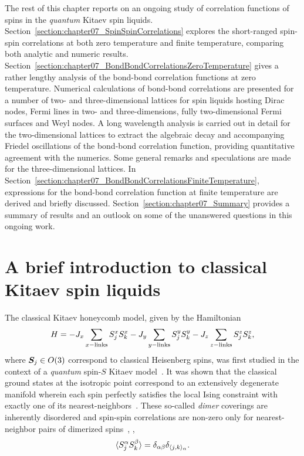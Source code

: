 The rest of this chapter reports on an ongoing study of correlation functions of spins in the \textit{quantum} Kitaev spin liquids.
Section~\ref{section:chapter07_SpinSpinCorrelations} explores the short-ranged spin-spin correlations at both zero temperature and finite temperature, comparing both analytic and numeric results.
Section~\ref{section:chapter07_BondBondCorrelationsZeroTemperature} gives a rather lengthy analysis of the bond-bond correlation functions at zero temperature.
Numerical calculations of bond-bond correlations are presented for a number of two- and three-dimensional lattices for spin liquids hosting Dirac nodes, Fermi lines in two- and three-dimensions, fully two-dimensional Fermi surfaces and Weyl nodes.
A long wavelength analysis is carried out in detail for the two-dimensional lattices to extract the algebraic decay and accompanying Friedel oscillations of the bond-bond correlation function, providing quantitative agreement with the numerics.
Some general remarks and speculations are made for the three-dimensional lattices.
In Section~\ref{section:chapter07_BondBondCorrelationsFiniteTemperature}, expressions for the bond-bond correlation function at finite temperature are derived and briefly discussed.
Section~\ref{section:chapter07_Summary} provides a summary of results and an outlook on some of the unanswered questions in this ongoing work.


%
%
\section{A brief introduction to classical Kitaev spin liquids}
\label{section:chapter07_ClassicalCorrelations}
%
%
The classical Kitaev honeycomb model, given by the Hamiltonian
%
\begin{equation}
	H = -J_x \sum_{x {\rm -links}} S_j^x S_k^x - J_y \sum_{y {\rm -links}} S_j^y S_k^y - J_z \sum_{z {\rm -links}} S_j^z S_k^z,
\end{equation}
%
where $\bm{S}_j \in O(3)$ correspond to classical Heisenberg spins, was first studied in the context of a \textit{quantum} spin-$S$ Kitaev model~\cite{BaskaranPRB2008}.
It was shown that the classical ground states at the isotropic point correspond to an extensively degenerate manifold wherein each spin perfectly satisfies the local Ising constraint with exactly one of its nearest-neighbors~\cite{BaskaranPRB2008,ChandraPRE2010}.
These so-called \textit{dimer} coverings are inherently disordered and spin-spin correlations are non-zero only for nearest-neighbor pairs of dimerized spins~\cite{Ghannad2019}, \ie,
%
\begin{equation}
	\langle S_j^{\alpha} S_k^{\beta} \rangle = \delta_{\alpha\beta} \delta_{\langle j,k \rangle_\alpha}.
\end{equation}
%

